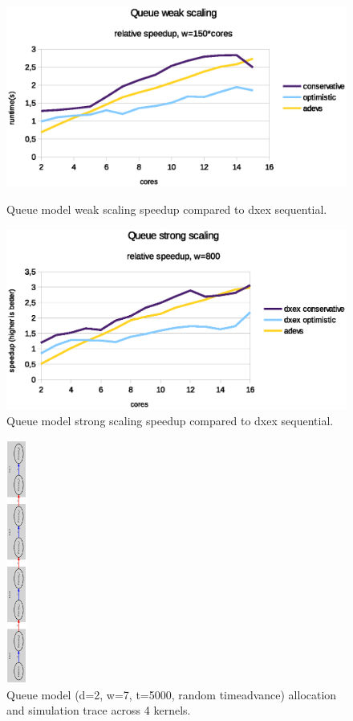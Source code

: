 \begin{figure}
	\center
	
	\includegraphics[width=\modelfraction\columnwidth]{fig/queue_fixed_weak_speedup.eps}
	\caption{Queue model weak scaling speedup compared to dxex sequential.}
	\label{fig:Queue_plot_weak}
	
	\includegraphics[width=\modelfraction\columnwidth]{fig/queue_fixed_strong_speedup.eps}
	\caption{Queue model strong scaling speedup compared to dxex sequential.}
	\label{fig:Queue_plot_strong}
		
\end{figure}

\begin{figure}
	\center
	
	\includegraphics[width=\modelfraction\columnwidth, height=8cm, keepaspectratio, angle=-90 ]{fig/queue_allocation.eps}
	\caption{Queue model (d=2, w=7, t=5000, random timeadvance) allocation and simulation trace across 4 kernels.}
	\label{fig:Queue_allocation}
	
\end{figure}

